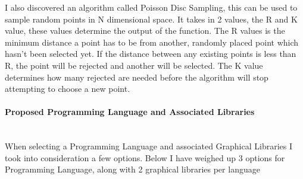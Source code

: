 \begin{flushleft}
                        I also discovered an algorithm called Poisson Disc Sampling, this can be used to sample random points 
                        in N dimensional space. It takes in 2 values, the R and K value, these values determine the output of
                        the function. The R values is the minimum distance a point has to be from another, randomly placed point
                        which hasn't been selected yet. If the distance between any existing points is less than R, the point
                        will be rejected and another will be selected. The K value determines how many rejected are needed before 
                        the algorithm will stop attempting to choose a new point.
                        
                    \paragraph{Proposed Programming Language and Associated Libraries} \mbox{} \\
                        \vspace{0.2cm}
                        When selecting a Programming Language and associated Graphical Libraries I took into consideration a few options.
                        Below I have weighed up 3 options for Programming Language, along with 2 graphical libraries per language
                        

\end{flushleft}

